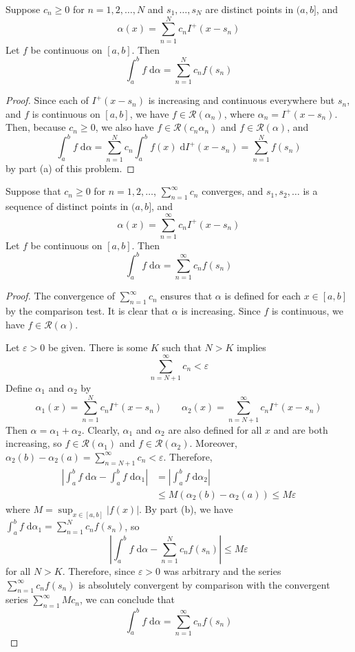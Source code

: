 \documentclass{homework}
\begin{document}
\begin{alphaparts}
		Suppose $c_n \ge 0$ for $n=1,2,\dots,N$ and $s_1, \dots, s_N$ are distinct points in $(a,b]$, and
		$$
		\alpha(x) = \sum_{n=1}^N c_n I^+(x-s_n)
		$$
		Let $f$ be continuous on $[a,b]$. Then
		$$
		\int_a^bf\;\text{d}\alpha = \sum_{n=1}^N c_nf(s_n)
		$$
		\begin{proof}
			Since each of $I^+(x-s_n)$ is increasing and continuous everywhere but $s_n$, and $f$ is continuous on $[a,b]$, we have $f \in \mathscr{R}(\alpha_n)$, where $\alpha_n = I^+(x-s_n)$. Then, because $c_n \ge 0$, we also have $f \in \mathscr{R}(c_n\alpha_n)$ and $f \in\mathscr{R}(\alpha)$, and 
			$$
			\int_a^b f\;\text{d}\alpha = \sum_{n=1}^Nc_n\int_a^bf(x)\;\text{d}I^+(x-s_n)=\sum_{n=1}^Nf(s_n)
			$$
			by part (a) of this problem.
		\end{proof}
	
		\questionpart %
		
		Suppose that $c_n \ge 0$ for $n=1,2,\dots$, $\sum_{n=1}^\infty c_n$ converges, and $s_1, s_2, \dots$ is a sequence of distinct points in $(a,b]$, and
		$$
		\alpha(x) = \sum_{n=1}^\infty c_nI^+(x-s_n)
		$$
		Let $f$ be continuous on $[a,b]$. Then
		$$
		\int_a^b f\;\text{d}\alpha = \sum_{n=1}^\infty c_nf(s_n)
		$$
		\begin{proof}
			The convergence of $\sum_{n=1}^\infty c_n$ ensures that $\alpha$ is defined for each $x \in [a,b]$ by the comparison test. It is clear that $\alpha$ is increasing. Since $f$ is continuous, we have $f \in \mathscr{R}(\alpha)$.
			
			Let $\varepsilon > 0$ be given. There is some $K$ such that $N > K$ implies
			$$
			\sum_{n=N+1}^\infty c_n< \varepsilon
			$$
			Define $\alpha_1$ and $\alpha_2$ by
			$$
			\alpha_1(x) = \sum_{n=1}^N c_nI^+(x-s_n)\qquad \alpha_2(x) = \sum_{n=N+1}^\infty c_nI^+(x-s_n)
			$$
			Then $\alpha = \alpha_1 + \alpha_2$. Clearly, $\alpha_1$ and $\alpha_2$ are also defined for all $x$ and are both increasing, so $f\in\mathscr{R}(\alpha_1)$ and $f\in \mathscr{R}(\alpha_2)$. Moreover, $\alpha_2(b) -\alpha_2(a) =\sum_{n=N+1}^\infty c_n < \varepsilon$. Therefore,
			$$
			\begin{aligned}
				\left|\int_a^b f\;\text{d}\alpha -\int_a^bf\;\text{d}\alpha_1\right| &=  \left|\int_a^bf\;\text{d}\alpha_2\right| \\
				&\le M(\alpha_2(b) - \alpha_2(a)) \le M\varepsilon
			\end{aligned}
			$$
			where $M = \sup_{x\in[a,b]}|f(x)|$. By part (b), we have $\int_a^b f \;\text{d}\alpha_1 = \sum_{n=1}^N c_nf(s_n)$, so
			$$
			\left|\int_a^bf \;\text{d}\alpha - \sum_{n=1}^Nc_nf(s_n)\right| \le M\varepsilon
			$$
			for all $N > K$. Therefore, since $\varepsilon >0$ was arbitrary and the series $\sum_{n=1}^\infty c_nf(s_n)$ is absolutely convergent by comparison with the convergent series $\sum_{n=1}^\infty Mc_n$, we can conclude that
			$$
			\int_a^b f\;\text{d}\alpha = \sum_{n=1}^\infty c_nf(s_n)
			$$
		\end{proof}
	\end{alphaparts}
	
\end{document}
